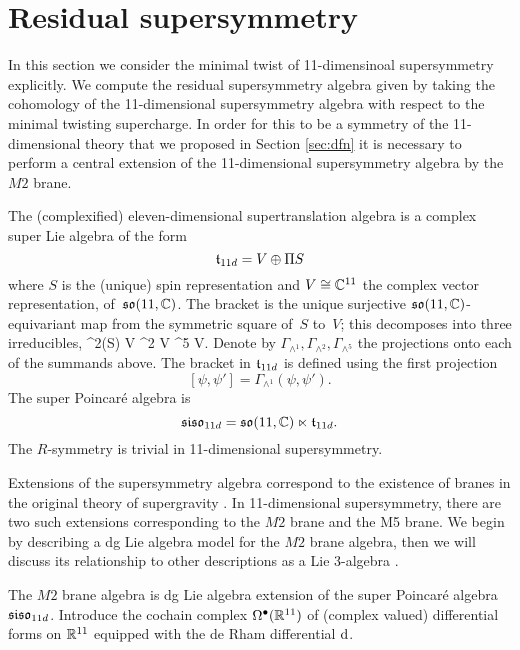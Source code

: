 \section{Residual supersymmetry} 
\label{sec:susy}

In this section we consider the minimal twist of 11-dimensinoal supersymmetry explicitly. 
We compute the residual supersymmetry algebra given by taking the cohomology of the 11-dimensional supersymmetry algebra with respect to the minimal twisting supercharge. 
In order for this to be a symmetry of the 11-dimensional theory that we proposed in Section \ref{sec:dfn} it is necessary to perform a central extension of the 11-dimensional supersymmetry algebra by the $M2$ brane.


The (complexified) eleven-dimensional supertranslation algebra is a complex super Lie algebra of the form
\[
  \mathfrak t_{11d} = V \oplus \Pi S
\]
where $S$ is the (unique) spin representation and $V \cong \mathbb C^{11}$ the complex vector representation, of~$\mathfrak{so}(11, \mathbb C)$. 
The bracket is the unique surjective $\mathfrak{so}(11,\mathbb C)$-equivariant map from the symmetric square of~$S$ to~$V$;
this decomposes into three irreducibles, 
\beqn\label{eqn:decomp}
  \Sym^2(S) \cong V \oplus \wedge^2 V \oplus \wedge^5 V.
\eeqn
Denote by $\Gamma_{\wedge^1}, \Gamma_{\wedge^2}, \Gamma_{\wedge^5}$ the projections onto each of the summands above. 
The bracket in $\mathfrak t_{11d}$ is defined using the first projection
\[
[\psi, \psi'] = \Gamma_{\wedge^1} (\psi, \psi') .
\]
The super Poincar\'{e} algebra is
\[
  \mathfrak{siso}_{11d} = \mathfrak{so}(11 , \mathbb C) \ltimes \mathfrak t_{11d} .
\]
The $R$-symmetry is trivial in 11-dimensional supersymmetry. 



Extensions of the supersymmetry algebra correspond to the existence of branes in the original theory of supergravity . 
In 11-dimensional supersymmetry, there are two such extensions corresponding to the $M2$ brane and the M5 brane.
We begin by describing a dg Lie algebra model for the $M2$ brane algebra, then we will discuss its relationship to other descriptions as a Lie 3-algebra \cite{Basu_2005,Bagger_2007,fiorenza2015super}. 

The $M2$ brane algebra is dg Lie algebra extension of the super Poincar\'e algebra $\mathfrak{siso}_{11d}$.
Introduce the cochain complex $\Omega^{\bullet}(\mathbb R^{11})$ of (complex valued) differential forms on $\mathbb R^{11}$ equipped with the de Rham differential ${\rm d}$.  
 

